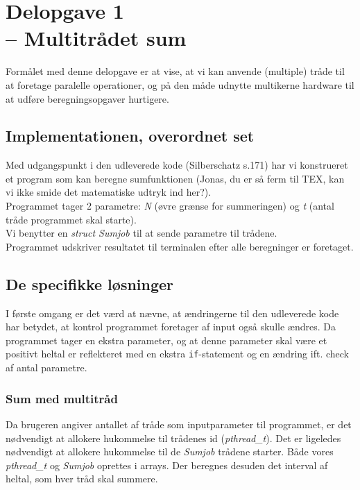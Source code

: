 \documentclass[main.tex]{subfile}
\begin{document}
\section{Delopgave 1\\\normalsize{-- Multitrådet sum}}
Formålet med denne delopgave er at vise, at vi kan anvende (multiple) tråde til at foretage paralelle operationer, og på den måde udnytte multikerne hardware til at udføre beregningsopgaver hurtigere.

\subsection{Implementationen, overordnet set}
Med udgangspunkt i den udleverede kode (Silberschatz s.171) har vi konstrueret et program som kan beregne sumfunktionen (Jonas, du er så ferm til TEX, kan vi ikke smide det matematiske udtryk ind her?).\\

Programmet tager 2 parametre: \textit{N} (øvre grænse for summeringen) og \textit{t} (antal tråde programmet skal starte).\\

Vi benytter en \textit{struct Sumjob} til at sende parametre til trådene.\\

Programmet udskriver resultatet til terminalen efter alle beregninger er foretaget.

\subsection{De specifikke løsninger}
I første omgang er det værd at nævne, at ændringerne til den udleverede kode har betydet, at kontrol programmet foretager af input også skulle ændres. Da programmet tager en ekstra parameter, og at denne parameter skal være et positivt heltal er reflekteret med en ekstra \texttt{if}-statement og en ændring ift. check af antal parametre.

\subsubsection{Sum med multitråd}
Da brugeren angiver antallet af tråde som inputparameter til programmet, er det nødvendigt at allokere hukommelse til trådenes id (\textit{pthread\_t}). Det er ligeledes nødvendigt at allokere hukommelse til de \textit{Sumjob} trådene starter. Både vores \textit{pthread\_t} og \textit{Sumjob} oprettes i arrays. Der beregnes desuden det interval af heltal, som hver tråd skal summere.\\ 
\end{document}
